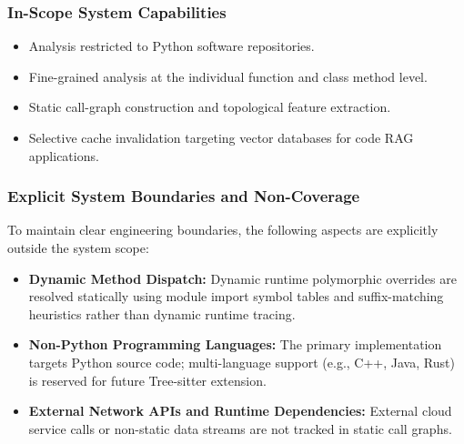 \documentclass[conference]{IEEEtran}
\begin{document}
\subsubsection{In-Scope System Capabilities}
\begin{itemize}
    \item Analysis restricted to Python software repositories.
    \item Fine-grained analysis at the individual function and class method level.
    \item Static call-graph construction and topological feature extraction.
    \item Selective cache invalidation targeting vector databases for code RAG applications.
\end{itemize}

\subsubsection{Explicit System Boundaries and Non-Coverage}
To maintain clear engineering boundaries, the following aspects are explicitly outside the system scope:
\begin{itemize}
    \item \textbf{Dynamic Method Dispatch:} Dynamic runtime polymorphic overrides are resolved statically using module import symbol tables and suffix-matching heuristics rather than dynamic runtime tracing.
    \item \textbf{Non-Python Programming Languages:} The primary implementation targets Python source code; multi-language support (e.g., C++, Java, Rust) is reserved for future Tree-sitter extension.
    \item \textbf{External Network APIs and Runtime Dependencies:} External cloud service calls or non-static data streams are not tracked in static call graphs.
\end{itemize}
\end{document}
